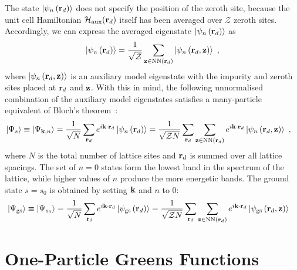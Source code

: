 \documentclass[reprint,hidelinks,onecolumn]{revtex4-2}
\begin{document}
The state \(\ket{\psi_n\left({\bf r}_d\right)}\) does not specify the position of the zeroth site, because the unit cell Hamiltonian \(\mathcal{H}_\text{aux}({\bf r}_d)\) itself has been averaged over \(\mathcal{Z}\) zeroth sites. Accordingly, we can express the averaged eigenstate \(\ket{\psi_n\left({\bf r}_d\right)}\) as
\begin{equation}\begin{aligned}
	\ket{\psi_n\left({\bf r}_d\right)} = \frac{1}{\sqrt\mathcal{Z}}\sum_{{\bf z} \in \text{NN}({\bf r}_d)}\ket{\psi_n\left({\bf r}_d, {\bf z}\right)}~,
\end{aligned}\end{equation}
where \(\ket{\psi_n\left({\bf r}_d, {\bf z}\right)}\) is an auxiliary model eigenstate with the impurity and zeroth sites placed at \({\bf r}_d\) and \({\bf z}\). With this in mind, the following unnormalised combination of the auxiliary model eigenstates satisfies a many-particle equivalent of Bloch's theorem~\cite{stoyanova}:
\begin{equation}\begin{aligned}\label{eigenstateProposal}
	\ket{\Psi_{s}} \equiv \ket{\Psi_{{\bf k}, n}} &= \frac{1}{\sqrt N}\sum_{{\bf r}_d} e^{i {\bf k}\cdot{\bf r}_d} \ket{\psi_{n}\left({\bf r}_d\right)} = \frac{1}{\sqrt{\mathcal{Z} N}}\sum_{{\bf r}_d}\sum_{{\bf z} \in \text{NN}({\bf r}_d)} e^{i {\bf k}\cdot{\bf r}_d} \ket{\psi_{n}\left({\bf r}_d, {\bf z}\right)}~,
\end{aligned}\end{equation}
where \(N\) is the total number of lattice sites and \({\bf r}_d\) is summed over all lattice spacings. The set of \(n=0\) states form the lowest band in the spectrum of the lattice, while higher values of \(n\) produce the more energetic bands. The ground state \(s = s_0\) is obtained by setting \({\bf k}\) and \(n\) to 0:
\begin{equation}\begin{aligned}\label{groundstateProposal}
	\ket{\Psi_\text{gs}} \equiv \ket{\Psi_{s_0}} &= \frac{1}{\sqrt N}\sum_{{\bf r}_d} e^{i {\bf k}\cdot{\bf r}_d} \ket{\psi_\text{gs}\left({\bf r}_d\right)} = \frac{1}{\sqrt{\mathcal{Z} N}}\sum_{{\bf r}_d}\sum_{{\bf z} \in \text{NN}({\bf r}_d)} e^{i {\bf k}\cdot{\bf r}_d} \ket{\psi_\text{gs}\left({\bf r}_d, {\bf z}\right)}
\end{aligned}\end{equation}

\section{One-Particle Greens Functions}
\end{document}
